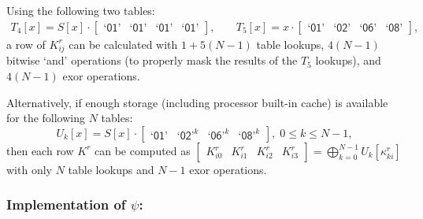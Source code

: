 \documentclass{llncs}
\newcommand{\gf}[1]{\textsf{`#1'}}
\begin{document}
Using the following two tables:
\[
\begin{array}{lcl}
T_4[x] = S[x] \cdot [\begin{array}{cccc}\gf{01} & \gf{01} & \gf{01} & \gf{01}\end{array}], %
& \; & %
T_5[x] = x    \cdot [\begin{array}{cccc}\gf{01} & \gf{02} & \gf{06} & \gf{08}\end{array}], %
\end{array}
\]
a row of $K^r_{ij}$ can be calculated with $1 + 5(N-1)$ table
lookups, $4(N-1)$ bitwise `and' operations (to properly mask the
results of the $T_5$ lookups), and $4(N-1)$ exor operations.

Alternatively, if enough storage (including processor built-in
cache) is available for the following $N$ tables:
\[
U_k[x] = S[x] \cdot [\begin{array}{cccc}\gf{01}^{} & \gf{02}^k &
\gf{06}^k & \gf{08}^k \end{array}], \; 0 \leqslant k \leqslant
N-1,
\]
then each row $K^r$ can be computed as
$[\begin{array}{cccc}K^r_{i0} & K^r_{i1} & K^r_{i2} &
K^r_{i3}\end{array}] = \bigoplus_{k=0}^{N-1}{U_k[\kappa^r_{ki}]}$
with only $N$ table lookups and $N-1$ exor operations.

\subsubsection{Implementation of $\psi$:}
\end{document}
